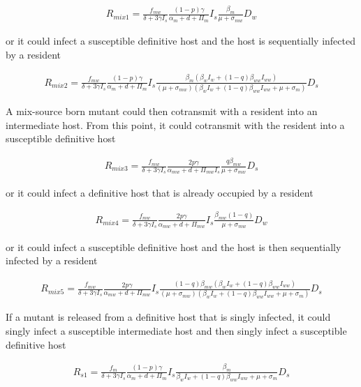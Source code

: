 \documentclass{article}
\begin{document}
\begin{align}
R_{mix1} = \frac{f_{mw}}{\delta +3 \gamma  I_s} \frac{ (1-p) \gamma}{\alpha_m + d + \Pi_m} I_s \frac{\beta_m }{\mu +\sigma_{mw}} D_w
\end{align}

or it could infect a susceptible definitive host and the host is sequentially infected by a resident

\begin{align}
R_{mix2} = \frac{f_{mw}}{\delta +3 \gamma  I_s} \frac{(1-p) \gamma}{\alpha_m + d + \Pi_m} I_s \frac{\beta_m (\beta_w I_w + (1-q) \beta_{ww} I_{ww})}{(\mu + \sigma_{mw}) (\beta_w I_w +  (1- q)\beta_{ww} I_{ww} + \mu + \sigma_m)} D_s
\end{align}

A mix-source born mutant could then cotransmit with a resident into an intermediate host. From this point, it could cotransmit with the resident into a susceptible definitive host

\begin{align}
R_{mix3} = \frac{f_{mw}}{\delta + 3 \gamma  I_s} \frac{2 p \gamma}{\alpha_{mw} + d + \Pi_{mw} I_s} \frac{q \beta_{mw}}{\mu + \sigma_{mw}} D_s
\end{align}

or it could infect a definitive host that is already occupied by a resident

\begin{align}
R_{mix4} = \frac{f_{mw}}{\delta +3 \gamma  I_s} \frac{2 p \gamma}{\alpha_{mw} + d + \Pi_{mw}} I_s \frac{\beta_{mw} (1-q)}{\mu + \sigma_{mw}} D_w
\end{align}

or it could infect a susceptible definitive host and the host is then sequentially infected by a resident

\begin{align}
R_{mix5} = \frac{f_{mw}}{\delta + 3 \gamma  I_s} \frac{2 p \gamma }{\alpha_{mw} + d + \Pi_{mw}} I_s \frac{(1-q) \beta_{mw}  (\beta_w I_w +(1-q) \beta_{ww} I_{ww} )}{(\mu +\sigma_{mw}) (\beta_w I_w +  (1-q)\beta_{ww} I_{ww} +\mu + \sigma_m)} D_s
\end{align}

If a mutant is released from a definitive host that is singly infected, it could singly infect a susceptible intermediate host and then singly infect a susceptible definitive host

\begin{align}
R_{s1} = \frac{f_m}{\delta +3 \gamma  I_s} \frac{(1-p) \gamma}{\alpha_m + d + \Pi_m} I_s \frac{\beta_m}{\beta_w I_w +  (1 - q) \beta_{ww} I_{ww} +\mu + \sigma_m} D_s
\end{align}
\end{document}
